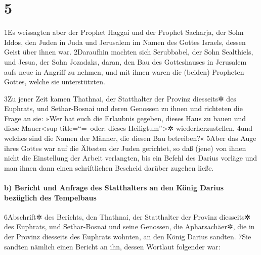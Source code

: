 \hypertarget{section-4}{%
\section{5}\label{section-4}}

1Es weissagten aber der Prophet Haggai und der Prophet Sacharja, der
Sohn Iddos, den Juden in Juda und Jerusalem im Namen des Gottes Israels,
dessen Geist über ihnen war. 2Daraufhin machten sich Serubbabel, der
Sohn Sealthiels, und Jesua, der Sohn Jozadaks, daran, den Bau des
Gotteshauses in Jerusalem aufs neue in Angriff zu nehmen, und mit ihnen
waren die (beiden) Propheten Gottes, welche sie unterstützten.

3Zu jener Zeit kamen Thathnai, der Statthalter der Provinz diesseits✲
des Euphrats, und Sethar-Bosnai und deren Genossen zu ihnen und
richteten die Frage an sie: »Wer hat euch die Erlaubnis gegeben, dieses
Haus zu bauen und diese Mauer\textless sup title=``=~oder: dieses
Heiligtum''\textgreater✲ wiederherzustellen, 4und welches sind die Namen
der Männer, die diesen Bau betreiben?« 5Aber das Auge ihres Gottes war
auf die Ältesten der Juden gerichtet, so daß (jene) von ihnen nicht die
Einstellung der Arbeit verlangten, bis ein Befehl des Darius vorläge und
man ihnen dann einen schriftlichen Bescheid darüber zugehen ließe.

\hypertarget{b-bericht-und-anfrage-des-statthalters-an-den-kuxf6nig-darius-bezuxfcglich-des-tempelbaus}{%
\paragraph{b) Bericht und Anfrage des Statthalters an den König Darius
bezüglich des
Tempelbaus}\label{b-bericht-und-anfrage-des-statthalters-an-den-kuxf6nig-darius-bezuxfcglich-des-tempelbaus}}

6Abschrift✲ des Berichts, den Thathnai, der Statthalter der Provinz
diesseits✲ des Euphrats, und Sethar-Bosnai und seine Genossen, die
Apharsachäer✲, die in der Provinz diesseits des Euphrats wohnten, an den
König Darius sandten. 7Sie sandten nämlich einen Bericht an ihn, dessen
Wortlaut folgender war:

